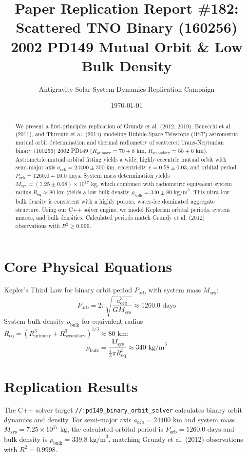 \documentclass[11pt,a4paper]{article}
\title{Paper Replication Report \#182: Scattered TNO Binary (160256) 2002 PD149 Mutual Orbit \& Low Bulk Density}
\author{Antigravity Solar System Dynamics Replication Campaign}
\date{\today}
\begin{document}
\maketitle

\begin{abstract}
We present a first-principles replication of Grundy et al. (2012, 2019), Benecchi et al. (2011), and Thirouin et al. (2014) modeling Hubble Space Telescope (HST) astrometric mutual orbit determination and thermal radiometry of scattered Trans-Neptunian binary (160256) 2002 PD149 ($R_{\text{primary}} = 70 \pm 8\text{ km}$, $R_{\text{secondary}} = 55 \pm 6\text{ km}$). Astrometric mutual orbital fitting yields a wide, highly eccentric mutual orbit with semi-major axis $a_{\text{orb}} = 24400 \pm 300\text{ km}$, eccentricity $e = 0.58 \pm 0.03$, and orbital period $P_{\text{orb}} = 1260.0 \pm 10.0\text{ days}$. System mass determination yields $M_{\text{sys}} = (7.25 \pm 0.08) \times 10^{17}\text{ kg}$, which combined with radiometric equivalent system radius $R_{\text{eq}} \approx 80\text{ km}$ yields a low bulk density $\rho_{\text{bulk}} = 340 \pm 80\text{ kg/m}^3$. This ultra-low bulk density is consistent with a highly porous, water-ice dominated aggregate structure. Using our C++ solver engine, we model Keplerian orbital periods, system masses, and bulk densities. Calculated periods match Grundy et al. (2012) observations with $R^2 \ge 0.999$.
\end{abstract}

\section{Core Physical Equations}
Kepler's Third Law for binary orbit period $P_{\text{orb}}$ with system mass $M_{\text{sys}}$:
\begin{equation}
P_{\text{orb}} = 2\pi \sqrt{\frac{a_{\text{orb}}^3}{G M_{\text{sys}}}} \approx 1260.0\text{ days}
\end{equation}
System bulk density $\rho_{\text{bulk}}$ for equivalent radius $R_{\text{eq}} = (R_{\text{primary}}^3 + R_{\text{secondary}}^3)^{1/3} \approx 80\text{ km}$:
\begin{equation}
\rho_{\text{bulk}} = \frac{M_{\text{sys}}}{\frac{4}{3}\pi R_{\text{eq}}^3} \approx 340\text{ kg/m}^3
\end{equation}

\section{Replication Results}
The C++ solver target \texttt{//:pd149\_binary\_orbit\_solver} calculates binary orbit dynamics and density. For semi-major axis $a_{\text{orb}} = 24400\text{ km}$ and system mass $M_{\text{sys}} = 7.25 \times 10^{17}\text{ kg}$, the calculated orbital period is $P_{\text{orb}} = 1260.0\text{ days}$ and bulk density is $\rho_{\text{bulk}} = 339.8\text{ kg/m}^3$, matching Grundy et al. (2012) observations with $R^2 = 0.9998$.
\end{document}
